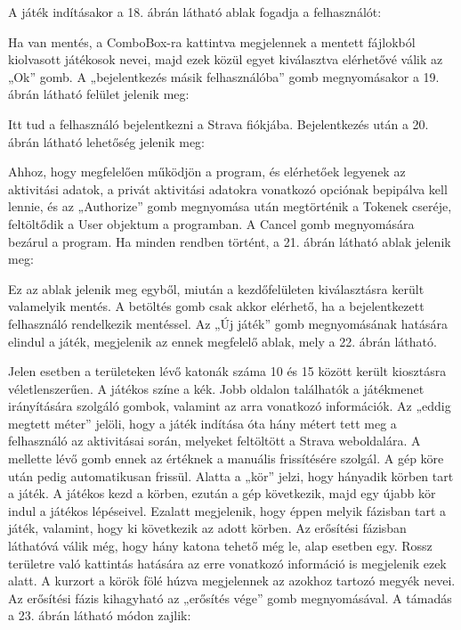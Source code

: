 A játék indításakor a 18. ábrán látható ablak fogadja a felhasználót: 

 


Ha van mentés, a ComboBox-ra kattintva megjelennek a mentett fájlokból kiolvasott játékosok nevei, majd ezek közül egyet kiválasztva elérhetővé válik az „Ok” gomb. A „bejelentkezés másik felhasználóba” gomb megnyomásakor a 19. ábrán látható felület jelenik meg: 

 


Itt tud a felhasználó bejelentkezni a Strava fiókjába. Bejelentkezés után a 20. ábrán látható lehetőség jelenik meg: 

 


Ahhoz, hogy megfelelően működjön a program, és elérhetőek legyenek az aktivitási adatok, a privát aktivitási adatokra vonatkozó opciónak bepipálva kell lennie, és az „Authorize” gomb megnyomása után megtörténik a Tokenek cseréje, feltöltődik a User objektum a programban. A Cancel gomb megnyomására bezárul a program. Ha minden rendben történt, a 21. ábrán látható ablak jelenik meg: 

 


Ez az ablak jelenik meg egyből, miután a kezdőfelületen kiválasztásra került valamelyik mentés. A betöltés gomb csak akkor elérhető, ha a bejelentkezett felhasználó rendelkezik mentéssel. Az „Új játék” gomb megnyomásának hatására elindul a játék, megjelenik az ennek megfelelő ablak, mely a 22. ábrán látható. 

 



Jelen esetben a területeken lévő katonák száma 10 és 15 között került kiosztásra véletlenszerűen. A játékos színe a kék. Jobb oldalon találhatók a játékmenet irányítására szolgáló gombok, valamint az arra vonatkozó információk. Az „eddig megtett méter” jelöli, hogy a játék indítása óta hány métert tett meg a felhasználó az aktivitásai során, melyeket feltöltött a Strava weboldalára. A mellette lévő gomb ennek az értéknek a manuális frissítésére szolgál. A gép köre után pedig automatikusan frissül. Alatta a „kör” jelzi, hogy hányadik körben tart a játék. A játékos kezd a körben, ezután a gép következik, majd egy újabb kör indul a játékos lépéseivel. Ezalatt megjelenik, hogy éppen melyik fázisban tart a játék, valamint, hogy ki következik az adott körben. Az erősítési fázisban láthatóvá válik még, hogy hány katona tehető még le, alap esetben egy. Rossz területre való kattintás hatására az erre vonatkozó információ is megjelenik ezek alatt. A kurzort a körök fölé húzva megjelennek az azokhoz tartozó megyék nevei. Az erősítési fázis kihagyható az „erősítés vége” gomb megnyomásával. A támadás a 23. ábrán látható módon zajlik: 

